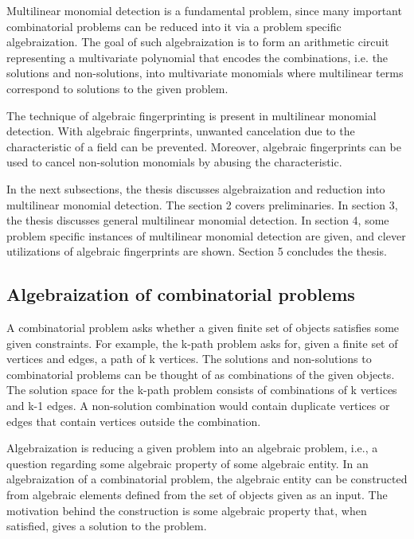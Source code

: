 Multilinear monomial detection 
is a fundamental problem, since many important combinatorial problems can be reduced into it 
via a problem specific algebraization. The goal of such algebraization is to form an arithmetic circuit representing a 
multivariate polynomial that encodes the combinations, i.e. the solutions and non-solutions, into multivariate monomials where 
multilinear terms correspond to solutions to the given problem.\nl

The technique of algebraic fingerprinting is present in multilinear monomial detection. 
With algebraic fingerprints, unwanted cancelation due to the characteristic of a field can be prevented. 
Moreover, algebraic fingerprints can be used to cancel non-solution monomials by abusing the characteristic.\nl

In the next subsections, the thesis discusses algebraization and reduction into multilinear monomial detection. 
The section 2 covers preliminaries. In section 3, the thesis discusses general multilinear monomial detection. 
In section 4, some problem specific instances of multilinear monomial detection are given, and clever 
utilizations of algebraic fingerprints are shown. Section 5 concludes the thesis.

\subsection{Algebraization of combinatorial problems}

A combinatorial problem asks whether a given finite set of objects satisfies some given constraints. 
For example, the k-path problem asks for, given a finite set of vertices and edges, 
a path of k vertices. The solutions and non-solutions to combinatorial problems can be thought of as 
combinations of the given objects. The solution space for the k-path problem consists of combinations of k vertices and k-1 edges. 
A non-solution combination would contain duplicate vertices or edges that contain vertices outside the combination.\nl

Algebraization is reducing a given problem into an algebraic problem, i.e., a question regarding some algebraic property of some algebraic entity. 
In an algebraization of a combinatorial problem, the algebraic entity can be constructed from algebraic elements defined from the 
set of objects given as an input. The motivation behind the construction is some algebraic property that, 
when satisfied, gives a solution to the problem.\nl

